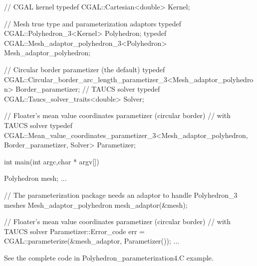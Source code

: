 \begin{ccExampleCode}

// CGAL kernel
typedef CGAL::Cartesian<double>                         Kernel;

// Mesh true type and parameterization adaptors
typedef CGAL::Polyhedron_3<Kernel>                      Polyhedron;
typedef CGAL::Mesh_adaptor_polyhedron_3<Polyhedron>     Mesh_adaptor_polyhedron;

// Circular border parametizer (the default)
typedef CGAL::Circular_border_arc_length_parametizer_3<Mesh_adaptor_polyhedron>
                                                        Border_parametizer;
// TAUCS solver
typedef CGAL::Taucs_solver_traits<double>               Solver;

// Floater's mean value coordinates parametizer (circular border)
// with TAUCS solver
typedef CGAL::Mean_value_coordinates_parametizer_3<Mesh_adaptor_polyhedron,
                                                   Border_parametizer,
                                                   Solver>
                                                        Parametizer;

int main(int argc,char * argv[])
{
    Polyhedron mesh;
    ...

    // The parameterization package needs an adaptor to handle Polyhedron_3 meshes
    Mesh_adaptor_polyhedron mesh_adaptor(&mesh);

    // Floater's mean value coordinates parametizer (circular border)
    // with TAUCS solver
    Parametizer::Error_code err = CGAL::parameterize(&mesh_adaptor, Parametizer());
    ...
}

\end{ccExampleCode}

See the complete code in Polyhedron\_parameterization4.C example.

